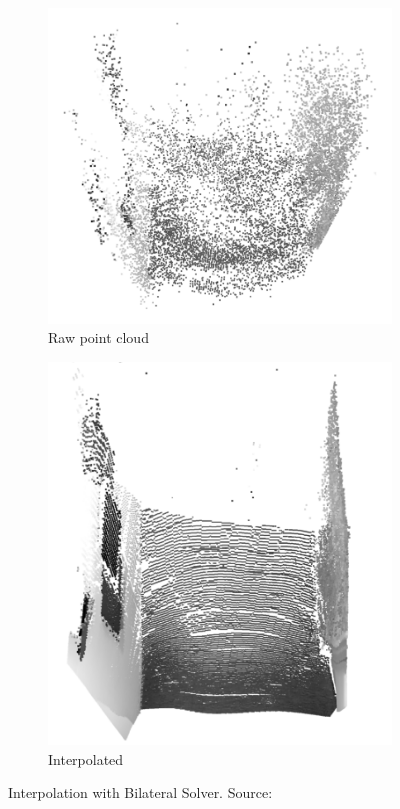 \begin{figure}[ht!]

    \centering
    \begin{subfigure}[b]{0.4\textwidth}
        \centering
        \includegraphics[width=\linewidth]{images/DepthFromMotionBilateral1}
        \caption{Raw point cloud}
    \end{subfigure}%
    \begin{subfigure}[b]{0.4\textwidth}
        \centering
        \includegraphics[width=\linewidth]{images/DepthFromMotionBilateral2}
        \caption{Interpolated}
    \end{subfigure}%
    \caption{Interpolation with Bilateral Solver. Source: \cite{valentin_depth_2018}}
    \label{fig:depth-from-motion-interpolation}
\end{figure}


